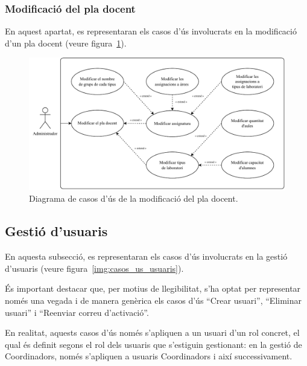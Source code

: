 \documentclass[a4paper,12pt]{ThesisStyle}
\begin{document}
\subsubsection{Modificació del pla docent}

En aquest apartat, es representaran els casos d'ús involucrats en la modificació d'un pla docent (veure figura~\ref{img:casos_us_pla_modif}).

\begin{figure}[H]
  \centering
  \includegraphics[width=\textwidth]{assets/use_cases/pla_docent/modif.pdf}
  \caption{\label{img:casos_us_pla_modif}Diagrama de casos d'ús de la modificació del pla docent.}
\end{figure}

\subsection{Gestió d'usuaris}
\label{subsec:casos_us_usuaris}

En aquesta subsecció, es representaran els casos d'ús involucrats en la gestió d'usuaris (veure figura~\ref{img:casos_us_usuaris}).

És important destacar que, per motius de llegibilitat, s'ha optat per representar només una vegada i de manera genèrica els casos d'ús ``Crear usuari'', ``Eliminar usuari'' i ``Reenviar correu d'activació''.

En realitat, aquests casos d'ús només s'apliquen a un usuari d'un rol concret, el qual és definit segons el rol dels usuaris que s'estiguin gestionant: en la gestió de Coordinadors, només s'apliquen a usuaris Coordinadors i així successivament.
\end{document}
